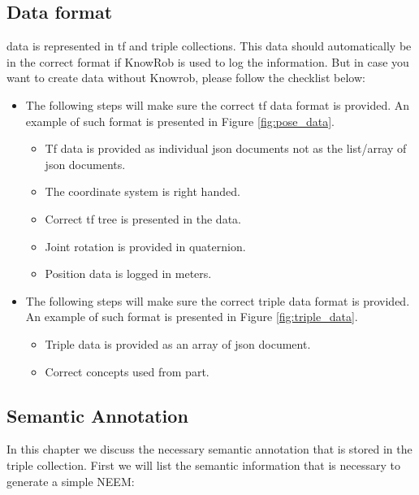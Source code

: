 \subsection{\neem Data format}

\neem data is represented in tf and triple collections. This data should automatically be in the correct format if KnowRob is used to log the information. But in case you want to create \neem data without Knowrob, please follow the checklist below:

\begin{itemize}
	\item The following steps will make sure the correct tf data format is provided. An example of such format is presented in Figure \ref{fig:pose_data}.
	\begin{itemize}
		\item Tf data is provided as individual json documents not as the list/array of json documents.
		\item The coordinate system is right handed.
		\item Correct tf tree is presented in the data.
		\item Joint rotation is provided in quaternion.
		\item Position data is logged in meters.
	\end{itemize}
	\item The following steps will make sure the correct triple data format is provided. An example of such format is presented in Figure \ref{fig:triple_data}.
	\begin{itemize}
		\item Triple data is provided as an array of json document.
		\item Correct \soma concepts used from \neemnar part.
	\end{itemize}
\end{itemize}

\subsection{Semantic Annotation}
\label{sec:semantic_annotation}

In this chapter we discuss the necessary semantic annotation that is stored in the triple collection. First we will list the semantic information that is necessary to generate a simple NEEM:

